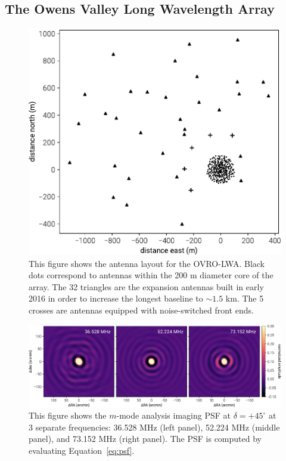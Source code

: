 \documentclass[twocolumn]{aastex61}
\begin{document}
\subsection{The Owens Valley Long Wavelength Array}

\begin{figure}[t]
    \includegraphics[width=\columnwidth]{figures/antenna-layout/antenna-layout}
    \caption{
        This figure shows the antenna layout for the OVRO-LWA. Black dots correspond to antennas
        within the 200 m diameter core of the array. The 32 triangles are the expansion antennas
        built in early 2016 in order to increase the longest baseline to $\sim1.5$ km. The 5 crosses
        are antennas equipped with noise-switched front ends.
    }
    \label{fig:antenna-layout}
\end{figure}

\begin{figure}[t]
    \includegraphics[width=\textwidth]{figures/psf/psf}
    \caption{
        This figure shows the $m$-mode analysis imaging PSF at $\delta = +45^\circ$ at 3 separate
        frequencies: 36.528 MHz (left panel), 52.224 MHz (middle panel), and 73.152 MHz (right
        panel). The PSF is computed by evaluating Equation~\ref{eq:psf}.
    }
    \label{fig:psf}
\end{figure}
\end{document}

